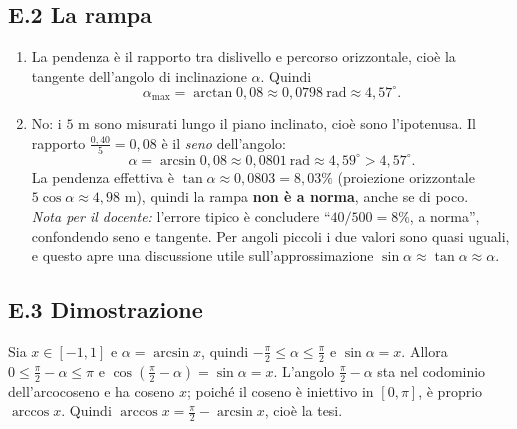 \documentclass[11pt,a4paper]{article}
\begin{document}
\subsection*{E.2 La rampa}
\begin{enumerate}
\item La pendenza \`e il rapporto tra dislivello e percorso orizzontale, cio\`e la tangente dell'angolo di inclinazione $\alpha$. Quindi
\[
\alpha_{\max}=\arctan 0{,}08\approx 0{,}0798\ \text{rad}\approx 4{,}57^\circ.
\]
\item No: i $5$ m sono misurati lungo il piano inclinato, cio\`e sono l'ipotenusa. Il rapporto $\frac{0{,}40}{5}=0{,}08$ \`e il \emph{seno} dell'angolo:
\[
\alpha=\arcsin 0{,}08\approx 0{,}0801\ \text{rad}\approx 4{,}59^\circ>4{,}57^\circ.
\]
La pendenza effettiva \`e $\tan\alpha\approx 0{,}0803=8{,}03\%$ (proiezione orizzontale $5\cos\alpha\approx 4{,}98$ m), quindi la rampa \textbf{non \`e a norma}, anche se di poco.\\
\emph{Nota per il docente:} l'errore tipico \`e concludere ``$40/500=8\%$, a norma'', confondendo seno e tangente. Per angoli piccoli i due valori sono quasi uguali, e questo apre una discussione utile sull'approssimazione $\sin\alpha\approx\tan\alpha\approx\alpha$.
\end{enumerate}

\subsection*{E.3 Dimostrazione}
Sia $x\in[-1,1]$ e $\alpha=\arcsin x$, quindi $-\frac{\pi}{2}\le\alpha\le\frac{\pi}{2}$ e $\sin\alpha=x$. Allora $0\le\frac{\pi}{2}-\alpha\le\pi$ e $\cos\left(\frac{\pi}{2}-\alpha\right)=\sin\alpha=x$. L'angolo $\frac{\pi}{2}-\alpha$ sta nel codominio dell'arcocoseno e ha coseno $x$; poich\'e il coseno \`e iniettivo in $[0,\pi]$, \`e proprio $\arccos x$. Quindi $\arccos x=\frac{\pi}{2}-\arcsin x$, cio\`e la tesi.
\end{document}
